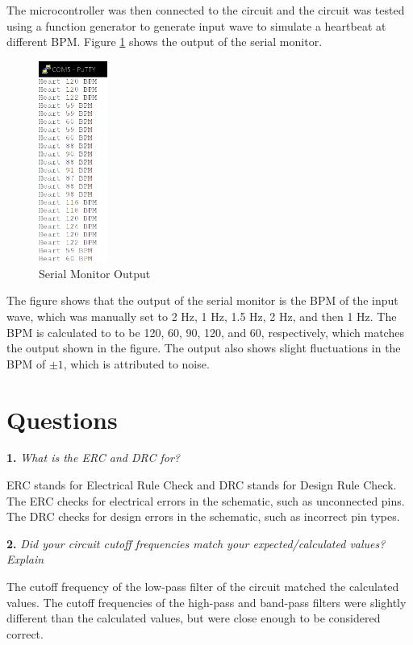 \documentclass[CMPE]{KGCOEReport}
\begin{document}
The microcontroller was then connected to the circuit and the circuit was tested using a function generator to generate input wave to simulate a heartbeat at different BPM. Figure \ref{fig:serialMonitor} shows the output of the serial monitor.

\begin{figure}[H]
    \centering
    \includegraphics[width=0.2\textwidth]{putty.png}
    \caption{Serial Monitor Output}
    \label{fig:serialMonitor}
\end{figure}

The figure shows that the output of the serial monitor is the BPM of the input wave, which was manually set to 2 Hz, 1 Hz, 1.5 Hz, 2 Hz, and then 1 Hz. The BPM is calculated to to be 120, 60, 90, 120, and 60, respectively, which matches the output shown in the figure. The output also shows slight fluctuations in the BPM of $\pm 1$, which is attributed to noise.

\section*{Questions}

\textbf{1.} \emph{What is the ERC and DRC for?}

ERC stands for Electrical Rule Check and DRC stands for Design Rule Check. The ERC checks for electrical errors in the schematic, such as unconnected pins. The DRC checks for design errors in the schematic, such as incorrect pin types.

\bigskip

\textbf{2.} \emph{Did your circuit cutoff frequencies match your expected/calculated values? Explain}

The cutoff frequency of the low-pass filter of the circuit matched the calculated values. The cutoff frequencies of the high-pass and band-pass filters were slightly different than the calculated values, but were close enough to be considered correct.
\end{document}

